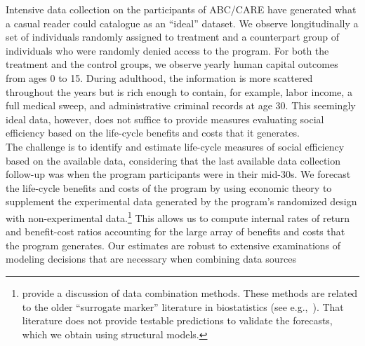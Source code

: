 \noindent Intensive data collection on the participants of ABC/CARE have generated what a casual reader could catalogue as an ``ideal'' dataset. We observe longitudinally a set of individuals randomly assigned to treatment and a counterpart group of individuals who were randomly denied access to the program. For both the treatment and the control groups, we observe yearly human capital outcomes from ages 0 to 15. During adulthood, the information is more scattered throughout the years but is rich enough to contain, for example, labor income, a full medical sweep, and administrative criminal records at age 30. This seemingly ideal data, however, does not suffice to provide measures evaluating social efficiency based on the life-cycle benefits and costs that it generates.\\

\noindent The challenge is to identify and estimate life-cycle measures of social efficiency based on the available data, considering that the last available data collection follow-up was when the program participants were in their mid-30s. We forecast the life-cycle benefits and costs of the program by using economic theory to supplement the experimental data generated by the program's randomized design with non-experimental data.\footnote{\citet{Ridder_Moffitt_2007_hbk_metricsdata} provide a discussion of data combination methods. These methods are related to the older ``surrogate marker'' literature in biostatistics (see e.g.,\ \citealp{Prentice_1989_Surrogate_SiM}). That literature does not provide testable predictions to validate the forecasts, which we obtain using structural models.} This allows us to compute internal rates of return and benefit-cost ratios accounting for the large array of benefits and costs that the program generates. Our estimates are robust to extensive examinations of modeling decisions that are necessary when combining data sources\\

